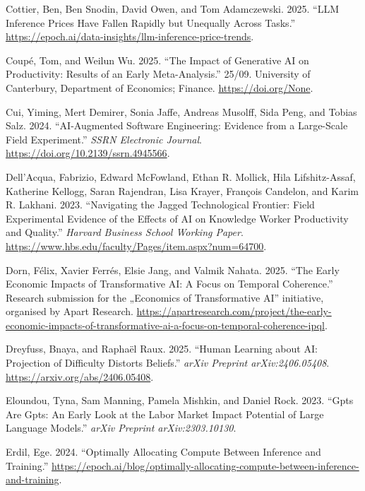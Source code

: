 \documentclass[
  letterpaper,
  DIV=11,
  numbers=noendperiod,
  oneside]{scrartcl}
\newlength{\cslhangindent}
\newenvironment{CSLReferences}[2] %
 {\begin{list}{}{%
  \setlength{\itemindent}{0pt}
  \setlength{\leftmargin}{0pt}
  \setlength{\parsep}{0pt}
  \ifodd #1
   \setlength{\leftmargin}{\cslhangindent}
   \setlength{\itemindent}{-1\cslhangindent}
  \fi
  \setlength{\itemsep}{#2\baselineskip}}}
 {\end{list}}
\begin{document}
\begin{CSLReferences}{1}{0}
Cottier, Ben, Ben Snodin, David Owen, and Tom Adamczewski. 2025. {``LLM
Inference Prices Have Fallen Rapidly but Unequally Across Tasks.''}
\url{https://epoch.ai/data-insights/llm-inference-price-trends}.

Coupé, Tom, and Weilun Wu. 2025. {``The Impact of Generative AI on
Productivity: Results of an Early Meta-Analysis.''} 25/09. University of
Canterbury, Department of Economics; Finance.
\url{https://doi.org/None}.

Cui, Yiming, Mert Demirer, Sonia Jaffe, Andreas Musolff, Sida Peng, and
Tobias Salz. 2024. {``AI-Augmented Software Engineering: Evidence from a
Large-Scale Field Experiment.''} \emph{SSRN Electronic Journal}.
\url{https://doi.org/10.2139/ssrn.4945566}.

Dell'Acqua, Fabrizio, Edward McFowland, Ethan R. Mollick, Hila
Lifshitz-Assaf, Katherine Kellogg, Saran Rajendran, Lisa Krayer,
François Candelon, and Karim R. Lakhani. 2023. {``Navigating the Jagged
Technological Frontier: Field Experimental Evidence of the Effects of AI
on Knowledge Worker Productivity and Quality.''} \emph{Harvard Business
School Working Paper}.
\url{https://www.hbs.edu/faculty/Pages/item.aspx?num=64700}.

Dorn, Félix, Xavier Ferrés, Elsie Jang, and Valmik Nahata. 2025. {``The
Early Economic Impacts of Transformative AI: A Focus on Temporal
Coherence.''} Research submission for the „Economics of Transformative
AI'' initiative, organised by Apart Research.
\url{https://apartresearch.com/project/the-early-economic-impacts-of-transformative-ai-a-focus-on-temporal-coherence-ipql}.

Dreyfuss, Bnaya, and Raphaël Raux. 2025. {``Human Learning about AI:
Projection of Difficulty Distorts Beliefs.''} \emph{arXiv Preprint
arXiv:2406.05408}. \url{https://arxiv.org/abs/2406.05408}.

Eloundou, Tyna, Sam Manning, Pamela Mishkin, and Daniel Rock. 2023.
{``Gpts Are Gpts: An Early Look at the Labor Market Impact Potential of
Large Language Models.''} \emph{arXiv Preprint arXiv:2303.10130}.

Erdil, Ege. 2024. {``Optimally Allocating Compute Between Inference and
Training.''}
\url{https://epoch.ai/blog/optimally-allocating-compute-between-inference-and-training}.


\end{CSLReferences}
\end{document}
